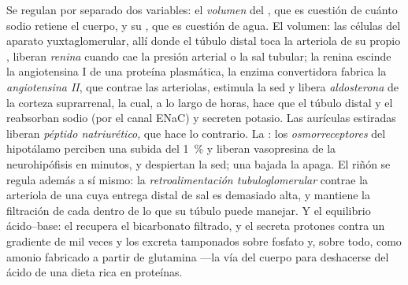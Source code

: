 \begin{definition}\label{def:b3:renal-osmoregulation:controls}
Se regulan por separado dos variables: el \emph{volumen} del , que es cuestión de cuánto sodio retiene el cuerpo, y su
\emph{}, que es cuestión de agua. El volumen: las células
del aparato yuxtaglomerular, allí donde el túbulo distal toca la
arteriola de su propio , liberan \emph{renina} cuando cae la
presión arterial o la sal tubular; la renina escinde la angiotensina I
de una proteína plasmática, la enzima convertidora fabrica la
\emph{angiotensina II}, que contrae las arteriolas, estimula la sed y
libera \emph{aldosterona} de la corteza suprarrenal, la cual, a lo
largo de horas, hace que el túbulo distal y el  reabsorban
sodio (por el canal ENaC) y secreten potasio. Las aurículas estiradas
liberan \emph{péptido natriurético}, que hace lo contrario. La
: los \emph{osmorreceptores} del hipotálamo perciben una
subida del \qty{1}{\%} y liberan vasopresina de la neurohipófisis en
minutos, y despiertan la sed; una bajada la apaga. El riñón se regula
además a sí mismo: la \emph{retroalimentación tubuloglomerular} contrae
la arteriola de una  cuya entrega distal de sal es demasiado
alta, y mantiene la filtración de cada  dentro de lo que su
túbulo puede manejar. Y el equilibrio ácido--base: el 
recupera el bicarbonato filtrado, y el  secreta protones
contra un gradiente de mil veces y los excreta tamponados sobre fosfato
y, sobre todo, como amonio fabricado a partir de glutamina ---la vía
del cuerpo para deshacerse del ácido de una dieta rica en proteínas.
\end{definition}

